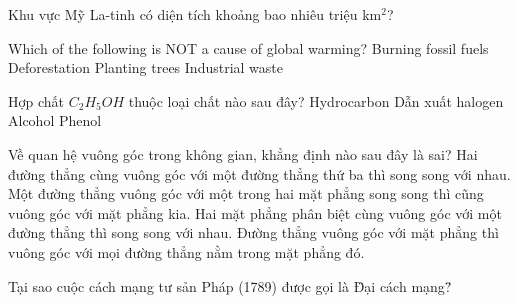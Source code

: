 \begin{ex}
    Khu vực Mỹ La-tinh có diện tích khoảng bao nhiêu triệu km$^2$?
\end{ex}
\begin{ex}
    Which of the following is NOT a cause of global warming?
    \choice
    {Burning fossil fuels}
    {Deforestation}
    {\True Planting trees}
    {Industrial waste}
\end{ex}
\begin{ex}
\end{ex}
\begin{ex}
    Hợp chất $C_2H_5OH$ thuộc loại chất nào sau đây?
    \choice
    {Hydrocarbon}
    {Dẫn xuất halogen}
    {\True Alcohol}
    {Phenol}
\end{ex}
\begin{ex}
    Về quan hệ vuông góc trong không gian, khẳng định nào sau đây là sai?
    \choiceTF
    {\True Hai đường thẳng cùng vuông góc với một đường thẳng thứ ba thì song song với nhau.}
    {Một đường thẳng vuông góc với một trong hai mặt phẳng song song thì cũng vuông góc với mặt phẳng kia.}
    {Hai mặt phẳng phân biệt cùng vuông góc với một đường thẳng thì song song với nhau.}
    {Đường thẳng vuông góc với mặt phẳng thì vuông góc với mọi đường thẳng nằm trong mặt phẳng đó.}
\end{ex}
\begin{ex}
    Tại sao cuộc cách mạng tư sản Pháp (1789) được gọi là \"Đại cách mạng\"?
\end{ex}
